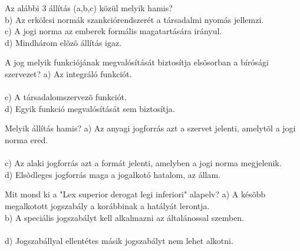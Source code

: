 \begin{frame}

\begin{tcolorbox}[title={5. Kérdés}]
Az alábbi 3 állítás (a,b,c) közül melyik hamis?
\tcblower
{}\\
b) Az erkölcsi normák szankciórendszerét a társadalmi nyomás jellemzi.\\
c) A jogi norma az emberek formális magatartására irányul.\\
d) Mindhárom elõzõ állítás igaz.
\end{tcolorbox}

\begin{tcolorbox}[title={6. Kérdés}]
A jog melyik funkciójának megvalósítását biztosítja elsõsorban a bírósági szervezet?
\tcblower
a) Az integráló funkciót.\\
\\
c) A társadalomszervezõ funkciót.\\
d) Egyik funkció megvalósítását sem biztosítja.
\end{tcolorbox}

\begin{tcolorbox}[title={7. Kérdés}]
Melyik állítás hamis?
\tcblower
a) Az anyagi jogforrás azt a szervet jelenti, amelytõl a jogi norma ered.\\
\\
c) Az alaki jogforrás azt a formát jelenti, amelyben a jogi norma megjelenik.\\
d) Elsõdleges jogforrás maga a jogalkotó hatalom, az állam. 
\end{tcolorbox}

\begin{tcolorbox}[title={8. Kérdés}]
Mit mond ki a "Lex superior derogat legi inferiori" alapelv?
\tcblower
a) A késõbb megalkotott jogszabály a korábbinak a hatályát lerontja.\\
b) A speciális jogszabályt kell alkalmazni az általánossal szemben.\\
\\
d) Jogszabállyal ellentétes másik jogszabályt nem lehet alkotni.
\end{tcolorbox}

\end{frame}


